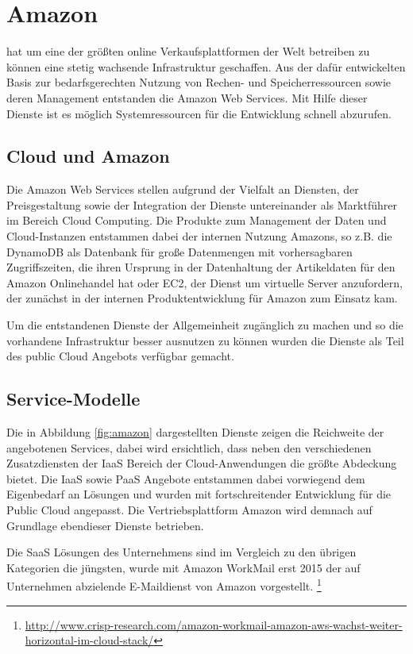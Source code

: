 \section{Amazon}
\label{sec_amazon}

 hat um eine der größten online Verkaufsplattformen der Welt betreiben zu können eine stetig wachsende Infrastruktur geschaffen. Aus der dafür entwickelten Basis zur bedarfsgerechten Nutzung von Rechen- und Speicherressourcen sowie deren Management entstanden die Amazon Web Services. Mit Hilfe dieser Dienste ist es möglich Systemressourcen für die Entwicklung schnell abzurufen.

\subsection{Cloud und Amazon}
\label{sec_amazon_general}
Die Amazon Web Services stellen aufgrund der Vielfalt an Diensten, der Preisgestaltung sowie der Integration der Dienste untereinander als Marktführer im Bereich Cloud Computing. Die Produkte zum Management der Daten und Cloud-Instanzen entstammen dabei der internen Nutzung Amazons, so z.B. die DynamoDB als Datenbank für große Datenmengen mit vorhersagbaren Zugriffszeiten, die ihren Ursprung in der Datenhaltung der Artikeldaten für den Amazon Onlinehandel hat oder EC2, der Dienst um virtuelle Server anzufordern, der zunächst in der internen Produktentwicklung für Amazon zum Einsatz kam. \cite{dynamo}

Um die entstandenen Dienste der Allgemeinheit zugänglich zu machen und so die vorhandene Infrastruktur besser ausnutzen zu können wurden die Dienste als Teil des public Cloud Angebots verfügbar gemacht.

\subsection{Service-Modelle}
\label{sec_amazon_delivery}
Die in Abbildung \ref{fig:amazon} dargestellten Dienste zeigen die Reichweite der angebotenen Services, dabei wird ersichtlich, dass neben den verschiedenen Zusatzdiensten der IaaS Bereich der Cloud-Anwendungen die größte Abdeckung bietet. Die IaaS sowie PaaS Angebote entstammen dabei vorwiegend dem Eigenbedarf an Lösungen und wurden mit fortschreitender Entwicklung für die Public Cloud angepasst. Die Vertriebsplattform Amazon wird demnach auf Grundlage ebendieser Dienste betrieben. \cite{dynamo}

Die SaaS Lösungen des Unternehmens sind im Vergleich zu den übrigen Kategorien die jüngsten, wurde mit Amazon WorkMail erst 2015 der auf Unternehmen abzielende E-Maildienst von Amazon vorgestellt. \footnote{\url{http://www.crisp-research.com/amazon-workmail-amazon-aws-wachst-weiter-horizontal-im-cloud-stack/}}

